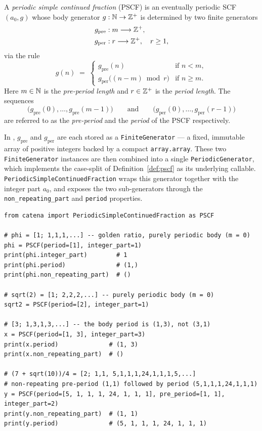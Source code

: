 \begin{definition}
  \label{def:pscf}
  A \emph{periodic simple continued fraction} (PSCF) is an eventually
  periodic SCF $(a_0, g)$ whose body generator $g: \mathbb{N} \to \mathbb{Z}^+$ is determined
  by two finite generators
  \begin{align*}
    g_{\mathrm{pre}} &: m \longrightarrow \mathbb{Z}^+, \\
    g_{\mathrm{per}} &: r \longrightarrow \mathbb{Z}^+, \quad r \geq 1,
  \end{align*}
  via the rule
  \[
    g(n) \;=\;
    \begin{cases}
      g_{\mathrm{pre}}(n)                              & \text{if } n < m, \\[4pt]
      g_{\mathrm{per}}\!\bigl((n - m) \bmod r\bigr)   & \text{if } n \geq m.
    \end{cases}
  \]
  Here $m \in \mathbb{N}$ is the \emph{pre-period length} and $r \in \mathbb{Z}^+$ is the
  \emph{period length}.
  The sequences
  \[
    \bigl(g_{\mathrm{pre}}(0),\ldots,g_{\mathrm{pre}}(m-1)\bigr)
    \qquad\text{and}\qquad
    \bigl(g_{\mathrm{per}}(0),\ldots,g_{\mathrm{per}}(r-1)\bigr)
  \]
  are referred to as the \emph{pre-period} and the \emph{period} of the PSCF
  respectively.
\end{definition}

In \catena, $g_{\mathrm{pre}}$ and $g_{\mathrm{per}}$ are each stored as a
\texttt{FiniteGenerator} — a fixed, immutable array of positive integers backed
by a compact \texttt{array.array}.  These two \texttt{FiniteGenerator} instances
are then combined into a single \texttt{PeriodicGenerator}, which implements
the case-split of Definition~\ref{def:pscf} as its underlying callable.
\texttt{PeriodicSimpleContinuedFraction} wraps this generator together with the
integer part $a_0$, and exposes the two sub-generators through the
\texttt{non\_repeating\_part} and \texttt{period} properties.

\begin{catenadef}
\begin{lstlisting}[style=python]
from catena import PeriodicSimpleContinuedFraction as PSCF

# phi = [1; 1,1,1,...] -- golden ratio, purely periodic body (m = 0)
phi = PSCF(period=[1], integer_part=1)
print(phi.integer_part)        # 1
print(phi.period)              # (1,)
print(phi.non_repeating_part)  # ()

# sqrt(2) = [1; 2,2,2,...] -- purely periodic body (m = 0)
sqrt2 = PSCF(period=[2], integer_part=1)

# [3; 1,3,1,3,...] -- the body period is (1,3), not (3,1)
x = PSCF(period=[1, 3], integer_part=3)
print(x.period)              # (1, 3)
print(x.non_repeating_part)  # ()

# (7 + sqrt(10))/4 = [2; 1,1, 5,1,1,1,24,1,1,1,5,...]
# non-repeating pre-period (1,1) followed by period (5,1,1,1,24,1,1,1)
y = PSCF(period=[5, 1, 1, 1, 24, 1, 1, 1], pre_period=[1, 1], integer_part=2)
print(y.non_repeating_part)  # (1, 1)
print(y.period)              # (5, 1, 1, 1, 24, 1, 1, 1)
\end{lstlisting}
\end{catenadef}

